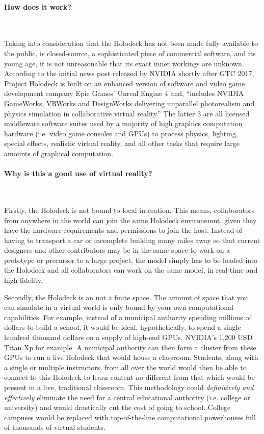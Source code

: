\documentclass[11pt]{article}
\begin{document}
\paragraph{How does it work?} ~ \par 
Taking into consideration that the Holodeck has not been made fully available to the public, is closed-source, a sophisticated piece of commercial software, and its young age, it is not unreasonable that its exact inner workings are unknown. According to the initial news post released by NVIDIA shortly after GTC 2017, \cite{nvidiablog1} Project Holodeck is built on an enhanced version of software and video game development company Epic Games' Unreal Engine 4 and, ``includes NVIDIA GameWorks, VRWorks and DesignWorks delivering unparallel photorealism and physics simulation in collaborative virtual reality.'' The latter 3 are all licensed middleware software suites used by a majority of high graphics computation hardware (i.e. video game consoles and GPUs) to process physics, lighting, special effects, realistic virtual reality, and all other tasks that require large amounts of graphical computation.

\paragraph{Why is this a good use of virtual reality?} ~ \par 
Firstly, the Holodeck is not bound to local interation. This means, collaborators from anywhere in the world can join the same Holodeck environemnt, given they have the hardware requirements and permissions to join the host. Instead of having to transport a car or incomplete building many miles away so that current designers and other contributors may be in the same space to work on a prototype or precursor to a large project, the model simply has to be loaded into the Holodeck and all collaborators can work on the same model, in real-time and high fidelity. 

Secondly, the Holodeck is an not a finite space. The amount of space that you can simulate in a virtual world is only bound by your own computational capabilities. For example, instead of a municipal authority spending millions of dollars to build a school, it would be ideal, hypothetically, to spend a single hundred thousand dollars on a supply of high-end GPUs, NVIDIA's 1,200 USD Titan Xp for example. A municipal authority can then form a cluster from these GPUs to run a live Holodeck that would house a classroom. Students, along with a single or multiple instructors, from all over the world would then be able to connect to this Holodeck to learn content no different from that which would be present in a live, traditional classroom. This methodology could \emph{definitively and effectively} eliminate the need for a central educational authority (i.e. college or university) and would drastically cut the cost of going to school. College campuses would be replaced with top-of-the-line computational powerhouses full of thousands of virtual students.
\end{document}

